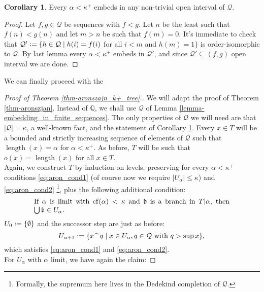 \documentclass[12pt,a4paper]{report}
\theoremstyle{definition}
\newtheorem{corollary}[theorem]{Corollary} %
\theoremstyle{num.custom-title}
\DeclareMathOperator{\sse}{\subseteq}
\DeclareMathOperator{\length}{length}
\DeclareMathOperator{\cf}{cf}
\newcommand{\Q}{\mathbb{Q}}
\newcommand{\conc}{^\frown}
\newcommand*{\defeq}{\mathrel{\rlap{%
                     \raisebox{0.3ex}{$\cdot$}}%
                     \raisebox{-0.3ex}{$\cdot$}}%
                     =}
\begin{document}
\begin{corollary}\label{corollary-embedding_in_finite_sequences}
\renewcommand{\Q}{\mathcal{Q}}
Every $\alpha < \kappa^+$ embeds in any non-trivial open interval of $\Q$.
\begin{proof}
Let $f,g \in \Q$ be sequences with $f<g$. Let $n$ be the least such that $f(n)<g(n)$ and let $m>n$ be such that $f(m)=0$. It's immediate to check that $\Q' \defeq \{h \in \Q \mid h(i)=f(i)$ for all $i<m$ and $h(m)=1 \}$ is order-isomorphic to $\Q$. By last lemma every $\alpha < \kappa^+$ embeds in $\Q'$, and since $\Q' \sse (f,g)$ open interval we are done.
\end{proof}
\end{corollary}

We can finally proceed with the

\begin{proof}[Proof of Theorem \ref{thm-aronszajn_k+_tree}.]
\renewcommand{\Q}{\mathcal{Q}}
We will adapt the proof of Theorem \ref{thm-aronszjan}. Instead of $\mathbb Q$, we shall use $\Q$ of Lemma \ref{lemma-embedding_in_finite_sequences}. The only properties of $\Q$ we will need are that $|\Q|=\kappa$, a well-known fact, and the statement of Corollary \ref{corollary-embedding_in_finite_sequences}. Every $x \in T$ will be a bounded and strictly increasing sequence of elements of $\Q$ such that $\length(x)=\alpha$ for $\alpha < \kappa^+$. As before, $T$ will be such that $o(x)=\length(x)$ for all $x \in T$.\\
Again, we construct $T$ by induction on levels, preserving for every $\alpha < \kappa^+$ conditions \eqref{eq:aron_cond1} (of course now we require $|U_\alpha| \leq \kappa$) and \eqref{eq:aron_cond2} \footnote{Formally, the supremum here lives in the Dedekind completion of $\Q$.}, plus the following additional condition:
\begin{equation}\label{eq:aron_cond3}
\begin{minipage}[t]{0.8\textwidth}
If $\alpha$ is limit with $\cf(\alpha) < \kappa$ and $\mathfrak{b}$ is a branch in $T|\alpha$, then $\bigcup \mathfrak{b} \in U_\alpha$.
\end{minipage}
\end{equation}
$U_0 \defeq \{\emptyset\}$ and the successor step are just as before:
\[
U_{\alpha+1} \defeq \{x \conc q \mid x \in U_\alpha, q \in \Q \text{ with } q > \sup x \},
\]
which satisfies \eqref{eq:aron_cond1} and \eqref{eq:aron_cond2}.\\
For $U_\alpha$ with $\alpha$ limit, we have again the claim:

\end{proof}
\end{document}
